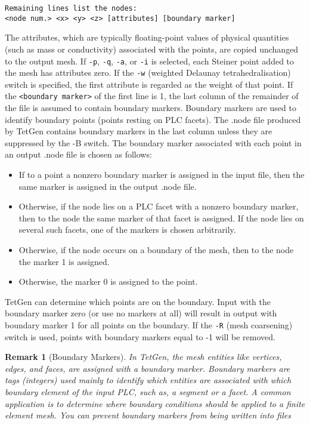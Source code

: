 \documentclass[12pt,twoside,a4paper]{article}
\numberwithin{equation}{section}
\newtheorem{remark}{Remark}[section]
\newcommand{\tetp}{\texttt{-p}}
\newcommand{\tetq}{\texttt{-q}}
\newcommand{\teta}{\texttt{-a}}
\newcommand{\teti}{\texttt{-i}}
\newcommand{\tetw}{\texttt{-w}}
\newcommand{\tetR}{\texttt{-R}}
\begin{document}
\begin{enumerate}
\begin{lstlisting}[style=raycodetetgenpoly,numbers=none]
Remaining lines list the nodes:
<node num.> <x> <y> <z> [attributes] [boundary marker]
\end{lstlisting}
The attributes, which are typically floating-point values of physical
quantities (such as mass or conductivity) associated with the points, are
copied unchanged to the output mesh.  If \tetp{}, \tetq{}, \teta{}, or
\teti{} is selected, each Steiner point added to the mesh has attributes
zero.  If the \tetw{} (weighted Delaunay tetrahedralisation) switch is
specified, the first attribute is regarded as the weight of that point.  If
the \texttt{<boundary marker>} of the first line is 1, the last column of
the remainder of the file is assumed to contain boundary markers. Boundary
markers are used to identify boundary points (points resting on PLC facets).
The .node file produced by TetGen contains boundary markers in the last
column unless they are suppressed by the -B switch. The boundary marker
associated with each point in an output .node file is chosen as follows:
\begin{itemize}
  \item If to a point a nonzero boundary marker is assigned in the input
    file, then the same marker is assigned in the output .node file.
  \item Otherwise, if the node lies on a PLC facet with a nonzero boundary
    marker, then to the node the same marker of that facet is assigned.  If
    the node lies on several such facets, one of the markers is chosen
    arbitrarily.
  \item Otherwise, if the node occurs on a boundary of the mesh, then to the
    node the marker 1 is assigned.
  \item Otherwise, the marker 0 is assigned to the point.
\end{itemize}
TetGen can determine which points are on the boundary. Input with the
boundary marker zero (or use no markers at all) will result in output with
boundary marker 1 for all points on the boundary.  If the \tetR{} (mesh
coarsening) switch is used, points with boundary markers equal to -1 will be
removed.
\begin{remark}[Boundary Markers]
  In TetGen, the mesh entities like vertices, edges, and faces, are assigned
  with a boundary marker. Boundary markers are tags (integers) used mainly
  to identify which entities are associated with which boundary element of
  the input PLC, such as, a segment or a facet. A common application is to
  determine where boundary conditions should be applied to a finite element
  mesh.  You can prevent boundary markers from being written into files

\end{remark}
\end{enumerate}
\end{document}
